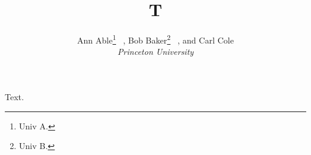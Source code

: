 \documentclass{aiaa-tc}
\title{T}
\author{Ann Able\thanks{Univ A.} \ , Bob Baker\thanks{Univ B.} \ , and Carl Cole\thanksibid{2}\\ {\normalsize\itshape Princeton University}}
\begin{document}
\maketitle
Text.
\end{document}
